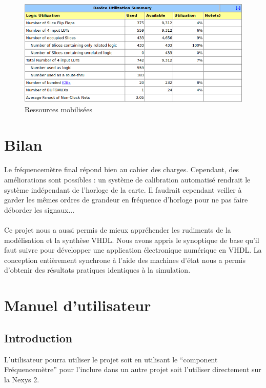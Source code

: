 \documentclass[a4paper,11pt]{article}
\begin{document}
\begin{figure}[H]
\begin{center}
	\includegraphics[scale=.5]{summary.png}
	\caption{Ressources mobilisées}
\end{center}
\end{figure}



\newpage
\section{Bilan}

\paragraph{} Le fréquencemètre final répond bien au cahier des charges. Cependant, des améliorations sont possibles :
un système de calibration automatisé rendrait le système indépendant de l'horloge de la carte. 
Il faudrait cependant veiller à garder les mêmes ordres de grandeur en fréquence d'horloge pour ne pas 
faire déborder les signaux...



\paragraph{} Ce projet nous a aussi permis de mieux appréhender les rudiments de la modélisation et la synthèse VHDL.
Nous avons appris le synoptique de base qu'il faut suivre pour développer une application électronique numérique en VHDL.
La conception entièrement synchrone à l'aide des machines d'état nous a permis d'obtenir des résultats pratiques identiques 
à la simulation.

\newpage
\appendix
\section{Manuel d'utilisateur}
\subsection{Introduction}
L'utilisateur pourra utiliser le projet soit en utilisant le ``component Fréquencemètre'' pour l'inclure dans un autre projet soit l'utiliser directement sur la Nexys 2.
\end{document}
